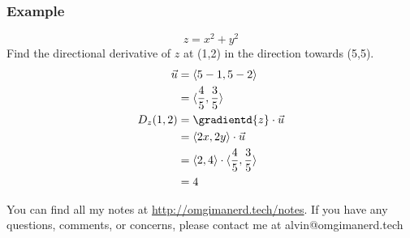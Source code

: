 \documentclass{math}
\begin{document}
\subsubsection*{Example}
\[ z = x^2+y^2 \]
Find the directional derivative of \( z \) at (1,2) in the direction towards
(5,5).
\begin{align*}
  \vec{u} &= \langle5-1,5-2\rangle \\
  &= \langle\frac{4}{5},\frac{3}{5}\rangle \\
  D_z(1,2) &= \gradientd{z}\cdot\vec{u} \\
  &= \langle2x,2y\rangle\cdot\vec{u} \\
  &= \langle2,4\rangle\cdot\langle\frac{4}{5},\frac{3}{5}\rangle \\
  &= 4
\end{align*}

\begin{center}
  You can find all my notes at \url{http://omgimanerd.tech/notes}. If you have
  any questions, comments, or concerns, please contact me at
  alvin@omgimanerd.tech
\end{center}
\end{document}
